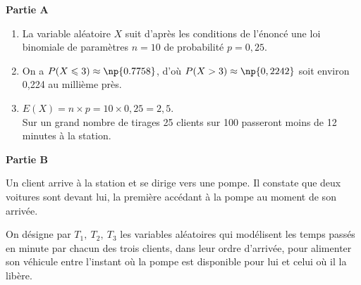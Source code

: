 
\medskip

\begin{center}\textbf{Partie A } \end{center}

%

\medskip

\begin{enumerate}
\item %
La variable aléatoire $X$ suit d'après les conditions de l'énoncé une loi binomiale de paramètres $n = 10$ de probabilité $p = 0,25$.

\item %
On a $P(X \leqslant 3) \approx \np{0.7758}$, d'où $P(X > 3) \approx \np{0,2242}$ soit environ 0,224 au millième près.

\item %
$E(X) = n \times p = 10 \times 0,25 = 2,5$.\\
Sur un grand nombre de tirages  25 clients sur 100 passeront moins de 12 minutes à la station.
\end{enumerate}

\begin{center}\textbf{Partie B } \end{center}

Un client arrive à la station et se dirige vers une pompe. Il constate que deux voitures sont
devant lui, la première accédant à la pompe au moment de son arrivée.

On désigne par $T_1,\: T_2,\: T_3$ les variables aléatoires qui modélisent les temps passés en minute par chacun des trois clients, dans leur ordre d'arrivée, pour alimenter son véhicule entre l'instant où la pompe est disponible pour lui et celui où il la libère.

